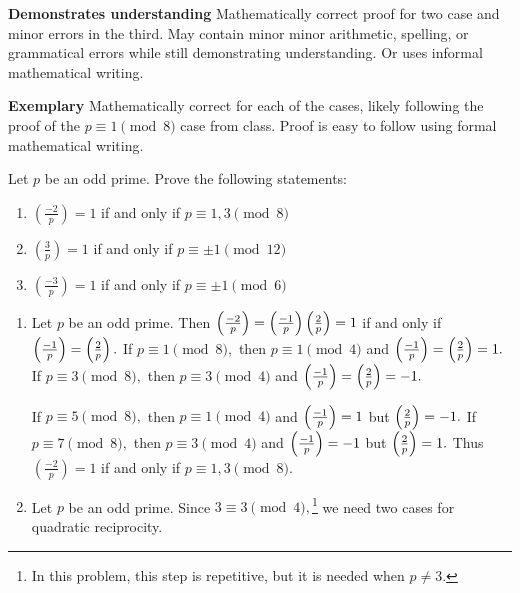\documentclass[letterpaper, 11pt]{ximera}
\begin{document}
\begin{ex}
\begin{writeRubric}
    \item \textbf{Demonstrates understanding} Mathematically correct proof for two case and minor errors in the third. May contain minor minor arithmetic, spelling, or grammatical errors while still demonstrating understanding. Or uses informal mathematical writing.
    
    \item \textbf{Exemplary} Mathematically correct for each of the cases, likely following the proof of the $p\equiv 1 \pmod 8$ case from class. Proof is easy to follow using formal mathematical writing.
        
\end{writeRubric}
\end{ex}

\begin{ex}
 	Let $p$ be an odd prime. Prove the following statements:
	\begin{enumerate}[label=(\alph*)]
		 \item\label{minus2}$\left(\frac{-2}{p}\right)=1$ if and only if $p\equiv 1,3 \pmod8$
 		\item\label{3}$\left(\frac{3}{p}\right)=1$ if and only if $p\equiv\pm1 \pmod{12}$
		\item$\left(\frac{-3}{p}\right)=1$ if and only if $p\equiv\pm1 \pmod{6}$
	\end{enumerate}

	\begin{solution}
		\begin{enumerate}[label=(\alph*)]
			\item Let $p$ be an odd prime. Then $\left(\frac{-2}{p}\right)=\left(\frac{-1}{p}\right)\left(\frac{2}{p}\right)=1$ if and only if $\left(\frac{-1}{p}\right)=\left(\frac{2}{p}\right).$ If $p\equiv 1\pmod{8},$ then $p\equiv 1\pmod{4}$ and $\left(\frac{-1}{p}\right)=\left(\frac{2}{p}\right)=1.$ If $p\equiv 3\pmod{8},$ then $p\equiv 3\pmod{4}$ and $\left(\frac{-1}{p}\right)=\left(\frac{2}{p}\right)=-1.$
			
			If $p\equiv 5\pmod{8},$ then $p\equiv 1\pmod{4}$ and $\left(\frac{-1}{p}\right)=1$ but $\left(\frac{2}{p}\right)=-1.$ If $p\equiv 7\pmod{8},$ then $p\equiv 3\pmod{4}$ and $\left(\frac{-1}{p}\right)=-1$ but $\left(\frac{2}{p}\right)=1.$ Thus $\left(\frac{-2}{p}\right)=1$ if and only if $p\equiv 1,3 \pmod{8}.$
			
			\item Let $p$ be an odd prime. Since $3\equiv {3}\pmod{4},$\footnote{In this problem, this step is repetitive, but it is needed when $p\neq3$.} we need two cases for quadratic reciprocity. 
			

\end{enumerate}
\end{solution}
\end{ex}
\end{document}
